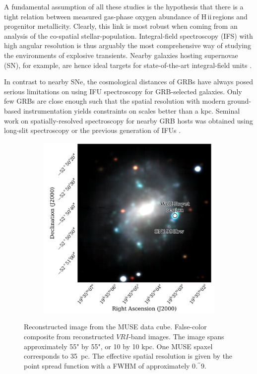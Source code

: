 \documentclass[traditabstract]{aa}
\newcommand{\farc}{\hbox{$.\!\!^{\prime\prime}$}}
\newcommand{\hii}{\mbox{H\,{\sc ii}}}
\begin{document}
A fundamental assumption of all these studies is the hypothesis that there is a tight relation between measured gas-phase oxygen abundance of \hii\,regions and progenitor metallicity. Clearly, this link is most robust when coming from an analysis of the co-spatial stellar-population. Integral-field spectroscopy (IFS) with high angular resolution is thus arguably the most comprehensive way of studying the environments of explosive transients. Nearby galaxies hosting supernovae (SN), for example, are hence ideal targets for state-of-the-art integral-field units \citep[IFUs, e.g.][]{2013AJ....146...30K, 2014A&A...572A..38G}.

In contrast to nearby SNe, the cosmological distances of GRBs \citep[e.g.][]{2009ApJS..185..526F, 2015A&A...581A.125K} have always posed serious limitations on using IFU spectroscopy for GRB-selected galaxies. Only few GRBs are close enough such that the spatial resolution with modern ground-based instrumentation yields constraints on scales better than a kpc. Seminal work on spatially-resolved spectroscopy for nearby GRB hosts was obtained using long-slit spectroscopy \citep[e.g.][]{2008ApJ...676.1151T, 2011ApJ...739...23L, 2015A&A...579A.126S} or the previous generation of IFUs \citep{2008A&A...490...45C, 2014MNRAS.441.2034T}. 

\begin{figure}
\begin{subfigure}{.42\textwidth}
  \includegraphics[width=0.990\linewidth]{Figs/MUSE_SN1998bw_RGB.pdf}
\end{subfigure}
\caption{Reconstructed image from the MUSE data cube. False-color composite from reconstructed $VRI$-band images. The image spans approximately 55" by 55", or 10 by 10 kpc. One MUSE spaxel corresponds to 35~pc. The effective spatial resolution is given by the point spread function with a FWHM of approximately 0\farc{9}.}
\label{fig:Host}
\end{figure}
\end{document}
